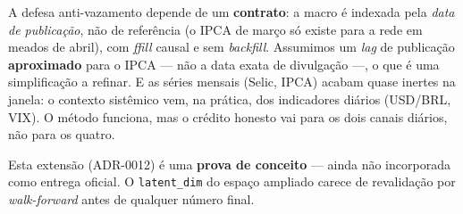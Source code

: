 \begin{honesto}
A defesa anti-vazamento depende de um \textbf{contrato}: a macro é indexada pela \emph{data de
publicação}, não de referência (o IPCA de março só existe para a rede em meados de abril), com
\emph{ffill} causal e sem \emph{backfill}. Assumimos um \emph{lag} de publicação \textbf{aproximado}
para o IPCA --- não a data exata de divulgação ---, o que é uma simplificação a refinar. E as séries
mensais (Selic, IPCA) acabam quase inertes na janela: o contexto sistêmico vem, na prática, dos
indicadores diários (USD/BRL, VIX). O método funciona, mas o crédito honesto vai para os dois canais
diários, não para os quatro.
\end{honesto}

\begin{honesto}
Esta extensão (ADR-0012) é uma \textbf{prova de conceito} --- ainda não incorporada como entrega
oficial. O \texttt{latent\_dim} do espaço ampliado carece de revalidação por \emph{walk-forward}
antes de qualquer número final.
\end{honesto}
